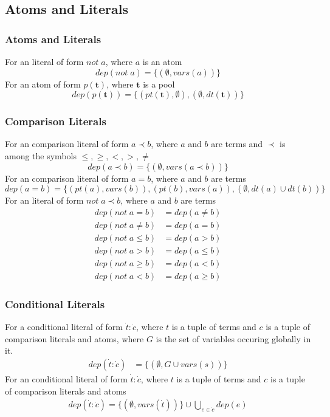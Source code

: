\documentclass{article}
\newcommand{\pool}[1]{\boldsymbol{#1}}
\newcommand{\tuple}[1]{\dot{#1}}
\newcommand{\set}[1]{\{#1\}}
\newcommand{\dep}[2]{\{(#1), (#2)\}}
\begin{document}
	\subsection{Atoms and Literals}
	\subsubsection{Atoms and Literals}
	For an literal of form $not \; a$, where $a$ is an atom
	\begin{equation*}
		dep(not \; a) = \set{(\emptyset, vars(a))}
	\end{equation*}
	For an atom of form $p(\pool{t})$, where $\pool{t}$ is a pool
	\begin{equation*}
		dep(p(\pool{t})) = \dep{pt(\pool{t}), \emptyset}{\emptyset, dt(\pool{t})}
	\end{equation*}

	\subsubsection{Comparison Literals}
	For an comparison literal of form $a \prec b$, where $a$ and $b$ are terms and $\prec$ is among the symbols $\leq,\ge,<,>,\neq$
	\begin{equation*}
		dep(a \prec b) = \set{(\emptyset, vars(a \prec b))}
	\end{equation*}
	For an comparison literal of form $a = b$, where $a$ and $b$ are terms
	\begin{equation*}
		dep(a = b) = \set{(pt(a), vars(b)), (pt(b), vars(a)), (\emptyset, dt(a) \cup dt(b))}
	\end{equation*}
	For an literal of form $not \; a \prec b$, where $a$ and $b$ are terms
	\begin{align*}
		dep(not \; a = b) &= dep(a \neq b) \\
		dep(not \; a \neq b) &= dep(a = b) \\
		dep(not \; a \leq b) &= dep(a > b) \\
		dep(not \; a > b) &= dep(a \leq b) \\
		dep(not \; a \ge b) &= dep(a < b) \\
		dep(not \; a < b) &= dep(a \ge b)
	\end{align*}

	\subsubsection{Conditional Literals}
	For a conditional literal of form $\tuple{t} : \tuple{c}$, where $t$ is a tuple of terms and $c$ is a tuple of comparison literals and atoms, where $G$ is the set of variables occuring globally in it.
	\begin{align*}
		dep(\tuple{t} : \tuple{c}) &= \set{(\emptyset, G \cup vars(s))}
	\end{align*}
	For an conditional literal of form $\tuple{t} : \tuple{c}$, where $t$ is a tuple of terms and $c$ is a tuple of comparison literals and atoms
	\begin{align*}
		dep(\tuple{t} : \tuple{c}) = \set{(\emptyset, vars(\tuple{t}))} \cup \bigcup_{e \in \tuple{c}} dep(e)
	\end{align*}
\end{document}
